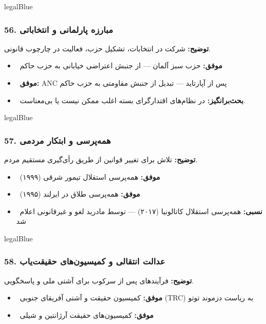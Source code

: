 \documentclass[a4paper,12pt]{article}
\newcommand{\success}[1]{\textcolor{greenPrimary}{\faCheckCircle\ \textbf{موفق:}} #1}
\newcommand{\partialresult}[1]{\textcolor{yellowPrimary}{\faExclamationTriangle\ \textbf{نسبی:}} #1}
\newcommand{\debate}[1]{\textcolor{orangePrimary}{\faQuestionCircle\ \textbf{بحث‌برانگیز:}} #1}
\newcommand{\methodnum}[1]{\textcolor{purpleLight}{\textbf{#1.}}}
\begin{document}
\begin{methodcard}{legalBlue}
\subsubsection{\methodnum{56} مبارزه پارلمانی و انتخاباتی}
\textbf{توضیح:} شرکت در انتخابات، تشکیل حزب، فعالیت در چارچوب قانونی.

\begin{itemize}[label=\textcolor{greenPrimary}{\faCheckCircle}]
  \item \success{حزب سبز آلمان — از جنبش اعتراضی خیابانی به حزب حاکم}
  \item \success{ANC پس از آپارتاید — تبدیل از جنبش مقاومتی به حزب حاکم}
\end{itemize}
\begin{itemize}[label=\textcolor{yellowPrimary}{\faExclamationTriangle}]
  \item \debate{در نظام‌های اقتدارگرای بسته اغلب ممکن نیست یا بی‌معناست.}
\end{itemize}
\end{methodcard}

\begin{methodcard}{legalBlue}
\subsubsection{\methodnum{57} همه‌پرسی و ابتکار مردمی}
\textbf{توضیح:} تلاش برای تغییر قوانین از طریق رأی‌گیری مستقیم مردم.

\begin{itemize}[label=\textcolor{greenPrimary}{\faCheckCircle}]
  \item \success{همه‌پرسی استقلال تیمور شرقی (۱۹۹۹)}
  \item \success{همه‌پرسی طلاق در ایرلند (۱۹۹۵)}
\end{itemize}
\begin{itemize}[label=\textcolor{yellowPrimary}{\faExclamationTriangle}]
  \item \partialresult{همه‌پرسی استقلال کاتالونیا (۲۰۱۷) — توسط مادرید لغو و غیرقانونی اعلام شد}
\end{itemize}
\end{methodcard}

\begin{methodcard}{legalBlue}
\subsubsection{\methodnum{58} عدالت انتقالی و کمیسیون‌های حقیقت‌یاب}
\textbf{توضیح:} فرآیندهای پس از سرکوب برای آشتی ملی و پاسخگویی.

\begin{itemize}[label=\textcolor{greenPrimary}{\faCheckCircle}]
  \item \success{کمیسیون حقیقت و آشتی آفریقای جنوبی (TRC) به ریاست دزموند توتو}
  \item \success{کمیسیون‌های حقیقت آرژانتین و شیلی}
\end{itemize}
\end{methodcard}
\end{document}
